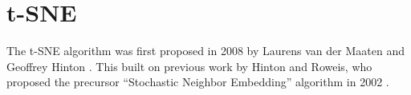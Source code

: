 \chapter{t-SNE}\label{chapter:t-sne}

The t-SNE algorithm was first proposed in 2008 by Laurens van der Maaten and Geoffrey Hinton \cite{vdMaa08}. 
This built on previous work by Hinton and Roweis, who proposed the precursor \enquote{Stochastic Neighbor Embedding} algorithm in 2002 \cite{Hinton02}. 




